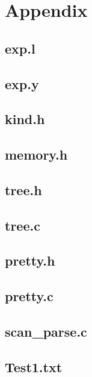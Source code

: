 \documentclass[a4paper,10pt,titlepage]{report}
\begin{document}
\newpage
\section{Appendix}
\subsection{exp.l}


\newpage
\subsection{exp.y}


\newpage
\subsection{kind.h}


\newpage
\subsection{memory.h}


\newpage
\subsection{tree.h}


\newpage
\subsection{tree.c}


\newpage
\subsection{pretty.h}


\newpage
\subsection{pretty.c}


\newpage
\subsection{scan\_parse.c}


\newpage
\subsection{Test1.txt}

\end{document}
